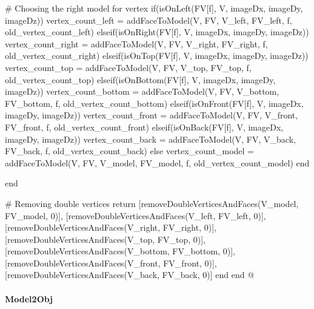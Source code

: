 \documentclass[11pt,oneside]{article}	%
\begin{document}
{    # Choosing the right model for vertex
    if(isOnLeft(FV[f], V, imageDx, imageDy, imageDz))
      vertex_count_left = addFaceToModel(V, FV, V_left, FV_left, f, old_vertex_count_left)
    elseif(isOnRight(FV[f], V, imageDx, imageDy, imageDz))
      vertex_count_right = addFaceToModel(V, FV, V_right, FV_right, f, old_vertex_count_right)
    elseif(isOnTop(FV[f], V, imageDx, imageDy, imageDz))
      vertex_count_top = addFaceToModel(V, FV, V_top, FV_top, f, old_vertex_count_top)
    elseif(isOnBottom(FV[f], V, imageDx, imageDy, imageDz))
      vertex_count_bottom = addFaceToModel(V, FV, V_bottom, FV_bottom, f, old_vertex_count_bottom)
    elseif(isOnFront(FV[f], V, imageDx, imageDy, imageDz))
      vertex_count_front = addFaceToModel(V, FV, V_front, FV_front, f, old_vertex_count_front)
    elseif(isOnBack(FV[f], V, imageDx, imageDy, imageDz))
      vertex_count_back = addFaceToModel(V, FV, V_back, FV_back, f, old_vertex_count_back)
    else
      vertex_count_model = addFaceToModel(V, FV, V_model, FV_model, f, old_vertex_count_model)
    end

  end

  # Removing double vertices
  return [removeDoubleVerticesAndFaces(V_model, FV_model, 0)],
  [removeDoubleVerticesAndFaces(V_left, FV_left, 0)],
  [removeDoubleVerticesAndFaces(V_right, FV_right, 0)],
  [removeDoubleVerticesAndFaces(V_top, FV_top, 0)],
  [removeDoubleVerticesAndFaces(V_bottom, FV_bottom, 0)],
  [removeDoubleVerticesAndFaces(V_front, FV_front, 0)],
  [removeDoubleVerticesAndFaces(V_back, FV_back, 0)]
end
end
@}

\paragraph{Model2Obj}
\end{document}
